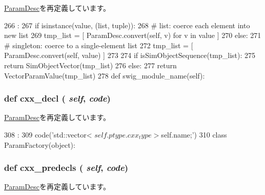 \hyperlink{classm5_1_1params_1_1ParamDesc_afe69e9190aa0b3889a9a5f63a42799f5}{ParamDesc}を再定義しています。


\begin{DoxyCode}
266                             :
267         if isinstance(value, (list, tuple)):
268             # list: coerce each element into new list
269             tmp_list = [ ParamDesc.convert(self, v) for v in value ]
270         else:
271             # singleton: coerce to a single-element list
272             tmp_list = [ ParamDesc.convert(self, value) ]
273 
274         if isSimObjectSequence(tmp_list):
275             return SimObjectVector(tmp_list)
276         else:
277             return VectorParamValue(tmp_list)
278 
    def swig_module_name(self):
\end{DoxyCode}
\hypertarget{classm5_1_1params_1_1VectorParamDesc_a723cbb1dc9ae0e7f3d102c6678f181c0}{
\subsubsection[{cxx\_\-decl}]{\setlength{\rightskip}{0pt plus 5cm}def cxx\_\-decl ( {\em self}, \/   {\em code})}}
\label{classm5_1_1params_1_1VectorParamDesc_a723cbb1dc9ae0e7f3d102c6678f181c0}


\hyperlink{classm5_1_1params_1_1ParamDesc_a723cbb1dc9ae0e7f3d102c6678f181c0}{ParamDesc}を再定義しています。


\begin{DoxyCode}
308                             :
309         code('std::vector< ${{self.ptype.cxx_type}} > ${{self.name}};')
310 
class ParamFactory(object):
\end{DoxyCode}
\hypertarget{classm5_1_1params_1_1VectorParamDesc_a0b408a11a14bd1d770e28f71a6e14ab5}{
\subsubsection[{cxx\_\-predecls}]{\setlength{\rightskip}{0pt plus 5cm}def cxx\_\-predecls ( {\em self}, \/   {\em code})}}
\label{classm5_1_1params_1_1VectorParamDesc_a0b408a11a14bd1d770e28f71a6e14ab5}


\hyperlink{classm5_1_1params_1_1ParamDesc_a0b408a11a14bd1d770e28f71a6e14ab5}{ParamDesc}を再定義しています。


